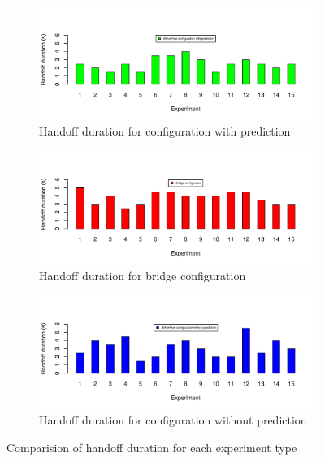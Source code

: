 \begin{figure}
\centering
  \begin{subfigure}[a]{\textwidth}
        \centering
      \includegraphics[width=1\textwidth]{figures/predduration.pdf}
      \caption{Handoff duration for \aetherflow configuration with prediction}
      \label{fig:pred}
  \end{subfigure}

  \begin{subfigure}[b]{\textwidth}
        \centering
      \includegraphics[width=1\textwidth]{figures/bridgeduration.pdf}
      \caption{Handoff duration for bridge configuration}
      \label{fig:bridge}
  \end{subfigure}

  \begin{subfigure}[c]{\textwidth}
  \centering
      \includegraphics[width=1\textwidth]{figures/simpleduration.pdf}
      \caption{Handoff duration for \aetherflow configuration without prediction}
      \label{fig:simple}
  \end{subfigure}%
  \caption{Comparision of handoff duration for each experiment type}
  \label{fig:duration}
\end{figure}

